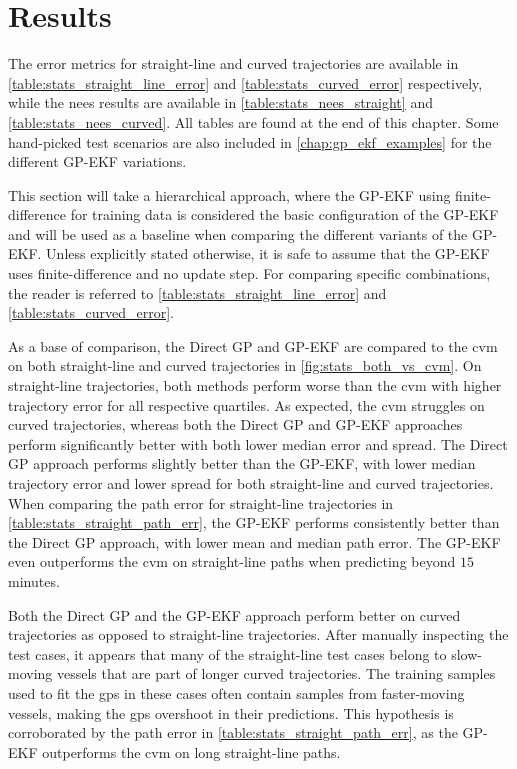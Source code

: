 \section{Results}
The error metrics for straight-line and curved trajectories are available in \cref{table:stats_straight_line_error} and \cref{table:stats_curved_error} respectively, while the \acrshort{nees} results are available in \cref{table:stats_nees_straight} and \cref{table:stats_nees_curved}. All tables are found at the end of this chapter. Some hand-picked test scenarios are also included in \cref{chap:gp_ekf_examples} for the different GP-EKF variations.

This section will take a hierarchical approach, where the GP-EKF using finite-difference for training data is considered the basic configuration of the GP-EKF and will be used as a baseline when comparing the different variants of the GP-EKF. Unless explicitly stated otherwise, it is safe to assume that the GP-EKF uses finite-difference and no update step. For comparing specific combinations, the reader is referred to \cref{table:stats_straight_line_error} and \cref{table:stats_curved_error}.

As a base of comparison, the Direct GP and GP-EKF are compared to the \acrshort{cvm} on both straight-line and curved trajectories in \cref{fig:stats_both_vs_cvm}. On straight-line trajectories, both methods perform worse than the \acrshort{cvm} with higher trajectory error for all respective quartiles. As expected, the \acrshort{cvm} struggles on curved trajectories, whereas both the Direct GP and GP-EKF approaches perform significantly better with both lower median error and spread. The Direct GP approach performs slightly better than the GP-EKF, with lower median trajectory error and lower spread for both straight-line and curved trajectories. When comparing the path error for straight-line trajectories in \cref{table:stats_straight_path_err}, the GP-EKF performs consistently better than the Direct GP approach, with lower mean and median path error. The GP-EKF even outperforms the \acrshort{cvm} on straight-line paths when predicting beyond $15$ minutes.

Both the Direct GP and the GP-EKF approach perform better on curved trajectories as opposed to straight-line trajectories. After manually inspecting the test cases, it appears that many of the straight-line test cases belong to slow-moving vessels that are part of longer curved trajectories.  The training samples used to fit the \acrshort{gp}s in these cases often contain samples from faster-moving vessels, making the \acrshort{gp}s overshoot in their predictions. This hypothesis is corroborated by the path error in \cref{table:stats_straight_path_err}, as the GP-EKF outperforms the \acrshort{cvm} on long straight-line paths.

